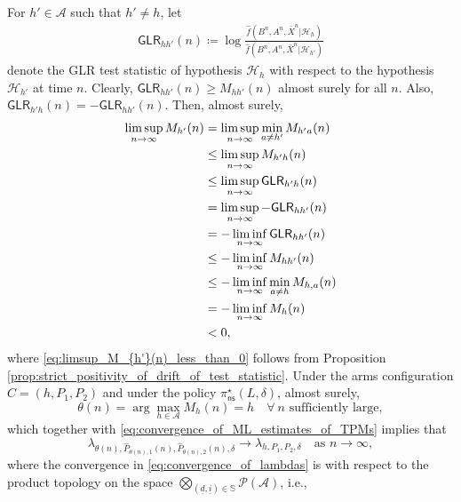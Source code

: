 For $h'\in \mathcal{A}$ such that $h'\neq h$, let
\begin{align}
	\textsf{GLR}_{hh'}(n)\coloneqq \log\frac{\hat{f}(B^n, A^n, \bar{X}^n|\mathcal{H}_h)}{\hat{f}(B^n, A^n, \bar{X}^n|\mathcal{H}_{h'})}
	\label{eq:GLR_test_statistic}
\end{align}
denote the GLR test statistic of hypothesis $\mathcal{H}_h$ with respect to the hypothesis $\mathcal{H}_{h'}$ at time $n$. Clearly, $\textsf{GLR}_{hh'}(n) \geq M_{hh'}(n)$ almost surely for all $n$. Also, $\textsf{GLR}_{h'h}(n)=-\textsf{GLR}_{hh'}(n)$. Then, almost surely,
\begingroup\allowdisplaybreaks\begin{align}
	\limsup\limits_{n\to\infty}M_{h'}(n)&=\limsup\limits_{n\to\infty}\min\limits_{a\neq h'}M_{h'a}(n)\nonumber\\
	&\leq \limsup\limits_{n\to\infty}M_{h'h}(n)\nonumber\\
	& \leq \limsup\limits_{n \to \infty} \textsf{GLR}_{h'h}(n)\nonumber\\
	&=\limsup\limits_{n\to\infty}-\textsf{GLR}_{hh'}(n)\nonumber\\
	&= -\liminf\limits_{n\to\infty}\textsf{GLR}_{hh'}(n)\nonumber\\
	& \leq -\liminf\limits_{n\to\infty}M_{hh'}(n)\nonumber\\
	&\leq -\liminf\limits_{n\to\infty}\min\limits_{a\neq h} M_{h,a}(n)\nonumber\\
	&= -\liminf\limits_{n\to\infty}M_{h}(n)\nonumber\\
	&<0,\label{eq:limsup_M_{h'}(n)_less_than_0}
\end{align}\endgroup
where \eqref{eq:limsup_M_{h'}(n)_less_than_0} follows from Proposition \ref{prop:strict_positivity_of_drift_of_test_statistic}. Under the arms configuration $C=(h, P_1, P_2)$ and under the policy $\pi_{\textsf{ns}}^\star(L, \delta)$, almost surely,
 \begin{equation}
 	\theta(n)=\arg\max\limits_{h\in\mathcal{A}}M_h(n)=h\quad \forall ~ n\text{ sufficiently large},\label{eq:h^*(n)_equal_to_h_almost_surely}
 \end{equation}
 which together with \eqref{eq:convergence_of_ML_estimates_of_TPMs} implies that
 \begin{equation}
 	\lambda_{\theta(n), \hat{P}_{\theta(n), 1}(n), \hat{P}_{\theta(n), 2}(n), \delta} \longrightarrow \lambda_{h, P_1, P_2, \delta} \quad \text{as }n\to \infty,
 	\label{eq:convergence_of_lambdas}
 \end{equation}
 where the convergence in \eqref{eq:convergence_of_lambdas} is with respect to the product topology on the space $\bigotimes\limits_{(\underline{d}, \underline{i})\in \mathbb{S}}\mathcal{P}(\mathcal{A})$, i.e.,
